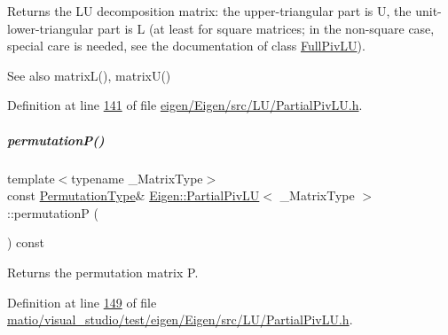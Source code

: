 \begin{DoxyReturn}{Returns}
the LU decomposition matrix\+: the upper-\/triangular part is U, the unit-\/lower-\/triangular part is L (at least for square matrices; in the non-\/square case, special care is needed, see the documentation of class \hyperlink{group___l_u___module_class_eigen_1_1_full_piv_l_u}{Full\+Piv\+LU}).
\end{DoxyReturn}
\begin{DoxySeeAlso}{See also}
matrix\+L(), matrix\+U() 
\end{DoxySeeAlso}


Definition at line \hyperlink{eigen_2_eigen_2src_2_l_u_2_partial_piv_l_u_8h_source_l00141}{141} of file \hyperlink{eigen_2_eigen_2src_2_l_u_2_partial_piv_l_u_8h_source}{eigen/\+Eigen/src/\+L\+U/\+Partial\+Piv\+L\+U.\+h}.

\mbox{\label{group___l_u___module_a1c637530b3215787668a75ebb2e7b882}} 
\subparagraph{\texorpdfstring{permutation\+P()}{permutationP()}\hspace{0.1cm}{\footnotesize\ttfamily [1/2]}}
{\footnotesize\ttfamily template$<$typename \+\_\+\+Matrix\+Type$>$ \\
const \hyperlink{group___core___module}{Permutation\+Type}\& \hyperlink{group___l_u___module_class_eigen_1_1_partial_piv_l_u}{Eigen\+::\+Partial\+Piv\+LU}$<$ \+\_\+\+Matrix\+Type $>$\+::permutationP (\begin{DoxyParamCaption}{ }\end{DoxyParamCaption}) const\hspace{0.3cm}{\ttfamily [inline]}}

\begin{DoxyReturn}{Returns}
the permutation matrix P. 
\end{DoxyReturn}


Definition at line \hyperlink{matio_2visual__studio_2test_2eigen_2_eigen_2src_2_l_u_2_partial_piv_l_u_8h_source_l00149}{149} of file \hyperlink{matio_2visual__studio_2test_2eigen_2_eigen_2src_2_l_u_2_partial_piv_l_u_8h_source}{matio/visual\+\_\+studio/test/eigen/\+Eigen/src/\+L\+U/\+Partial\+Piv\+L\+U.\+h}.

